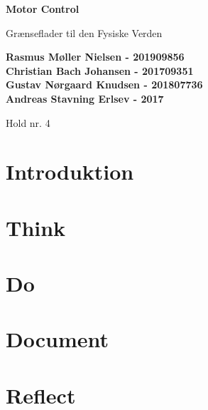 \documentclass{article}
\begin{document}
\begin{titlepage}
    
    \begin{center}
        \vspace*{1cm}
 
        \Huge
        \textbf{Motor Control}
 
        \vspace{0.5cm}
        \LARGE
        Grænseflader til den Fysiske Verden \\
        \date\today
 
        \vspace{1.5cm}
 
        \textbf{
        Rasmus Møller Nielsen - 201909856 \\
	   Christian Bach Johansen - 201709351\\
	   Gustav Nørgaard Knudsen - 201807736\\
	   Andreas Stavning Erlsev - 2017}
        
        \vfill
        \vspace{2cm}
 
        Hold nr. 4
 
    \end{center}
\end{titlepage}

\newpage
\tableofcontents
\newpage

\setcounter{page}{1}


\section{Introduktion}


\section{Think}


\section{Do}


\section{Document}


\section{Reflect}
\end{document}
